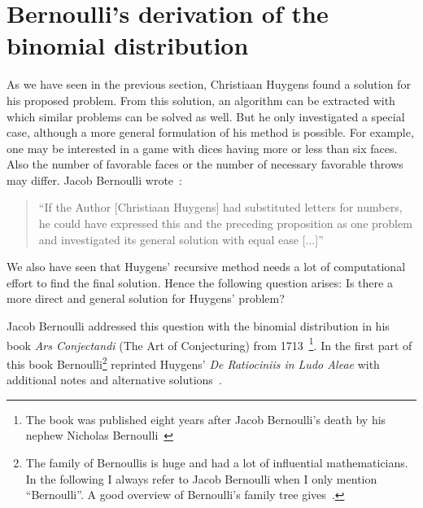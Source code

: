 \section{Bernoulli's derivation of the binomial distribution}


As we have seen in the previous section, Christiaan Huygens found a solution for his proposed problem. From this solution, an algorithm can be extracted with which similar problems can be solved as well. But he only investigated a special case, although a more general formulation of his method is possible. For example, one may be interested in a game with dices having more or less than six faces. Also the number of favorable faces or the number of necessary favorable throws may differ. Jacob Bernoulli wrote~\cite[p. 157]{bernoulli}:

\begin{quote}
  ``If the Author [Christiaan Huygens] had substituted letters for numbers, he could have expressed this and the preceding proposition as one problem and investigated its general solution with equal ease [...]''
\end{quote}


We also have seen that Huygens' recursive method needs a lot of computational effort to find the final solution. Hence the following question arises: Is there a more direct and general solution for Huygens' problem?

Jacob Bernoulli addressed this question with the binomial distribution in his book \emph{Ars Conjectandi} (The Art of Conjecturing) from 1713~\cite[pp. 220-256]{hald1}\footnote{The book was published eight years after Jacob Bernoulli's death by his nephew Nicholas Bernoulli~\cite[pp. 223-224]{hald1}}. In the first part of this book Bernoulli\footnote{The family of Bernoullis is huge and had a lot of influential mathematicians. In the following I always refer to Jacob Bernoulli when I only mention ``Bernoulli''. A good overview of Bernoulli's family tree gives~\cite[pp. 1-4]{bernoulli}.} reprinted Huygens' \emph{De Ratiociniis in Ludo Aleae} with additional notes and alternative solutions~\cite[p. 63]{bernoulli}.

